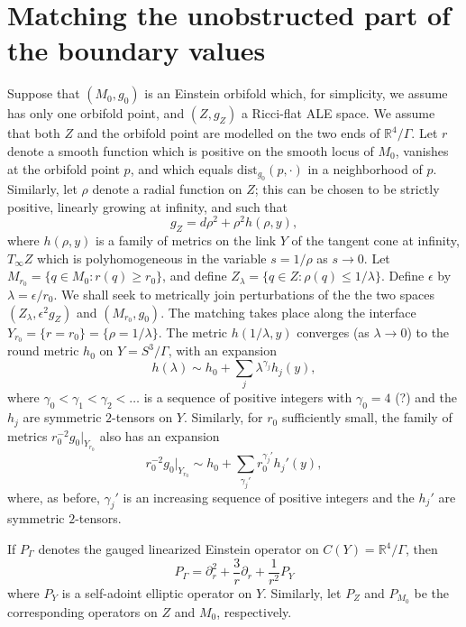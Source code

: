 \documentclass[12pt]{article}
\newcommand{\del}{\partial}
\newcommand{\RR}{\mathbb R}
\begin{document}
\section{Matching the unobstructed part of the boundary values}

Suppose that $(M_0,g_0)$ is an Einstein orbifold which, for simplicity, we assume has only one orbifold point, and $(Z, g_Z)$ a Ricci-flat ALE space. 
We assume that both $Z$ and the orbifold point are modelled on the two ends of $\RR^4/\Gamma$.  Let $r$ denote a smooth function which is 
positive on the smooth locus of $M_0$, vanishes at the orbifold point $p$,
and which equals $\mathrm{dist}_{g_0}(p, \cdot)$ in a neighborhood of $p$.  Similarly, let $\rho$ denote a radial function on $Z$; this can be chosen
to be strictly positive, linearly growing at infinity, and such that
\[
g_Z = d\rho^2 + \rho^2 h(\rho, y),
\]
where $h(\rho, y)$ is a family of metrics on the link $Y$ of the tangent cone at infinity, $T_\infty Z$ which is polyhomogeneous in the 
variable $s = 1/\rho$ as $s \to 0$.   Let $M_{r_0} = \{q \in M_0: r(q) \geq r_0\}$, and define $Z_\lambda  = \{ q \in Z:  \rho(q) \leq 1/\lambda\}$. 
Define $\epsilon$ by $\lambda = \epsilon/r_0$.  We shall seek to metrically join perturbations of the the two spaces $(Z_{\lambda} , \epsilon^2 g_Z)$ 
and $(M_{r_0}, g_0)$.   The matching takes place along the interface $Y_{r_0}  = \{r = r_0\} = \{\rho = 1/\lambda\}$.  The metric $h(1/\lambda, y)$ 
converges (as $\lambda \to 0$) to the round metric $h_0$ on $Y = S^3/\Gamma$, with an expansion
\[
h(\lambda) \sim h_0 + \sum_{j} \lambda^{\gamma_j} h_j(y),
\]
where $\gamma_0 < \gamma_1 < \gamma_2 < \ldots $ is a sequence of positive integers with $\gamma_0 = 4$ (?) and the $h_j$
are symmetric $2$-tensors on $Y$.  Similarly, for $r_0$ sufficiently small, the family of metrics $r_0^{-2} g_0|_{Y_{r_0}}$ also has an expansion
\[
r_0^{-2} g_0|_{Y_{r_0}} \sim  h_0 + \sum_{\gamma_j'} r_0^{\gamma_j'} h_j'(y),
\]
where, as before,  $\gamma_j'$ is an increasing sequence of positive integers and the $h_j'$ are symmetric $2$-tensors. 

If $P_\Gamma$ denotes the gauged linearized Einstein operator on $C(Y) = \RR^4/\Gamma$, then 
\[
P_\Gamma = \del_r^2 + \frac{3}{r} \del_r + \frac{1}{r^2} P_Y
\]
where $P_Y$ is a self-adoint elliptic operator on $Y$.  Similarly, let $P_Z$ and $P_{M_0}$ be the corresponding operators on $Z$ and $M_0$,
respectively. 
\end{document}

